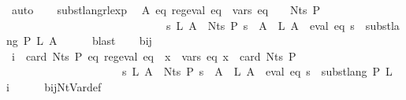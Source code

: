 \begin{isabellebody}
\ auto\isanewline
\ \ \isamarkupfalse%
\ subst{\isacharunderscore}{\kern0pt}lang{\isacharunderscore}{\kern0pt}rlexp\ \isamarkupfalse%
\ {\isachardoublequoteopen}{\isasymforall}A{\isachardot}{\kern0pt}\ {\isasymexists}eq{\isachardot}{\kern0pt}\ reg{\isacharunderscore}{\kern0pt}eval\ eq\ {\isasymand}\ vars\ eq\ {\isasymsubseteq}\ {\isasymgamma}{\isacharprime}{\kern0pt}\ {\isacharbackquote}{\kern0pt}\ Nts\ P\ {\isasymand}\isanewline
\ \ \ \ \ \ \ \ \ \ \ \ \ \ \ \ \ \ \ \ \ \ \ \ \ \ \ \ \ {\isacharparenleft}{\kern0pt}{\isasymforall}s\ L{\isachardot}{\kern0pt}\ {\isacharparenleft}{\kern0pt}{\isasymforall}A\ {\isasymin}\ Nts\ P{\isachardot}{\kern0pt}\ s\ {\isacharparenleft}{\kern0pt}{\isasymgamma}{\isacharprime}{\kern0pt}\ A{\isacharparenright}{\kern0pt}\ {\isacharequal}{\kern0pt}\ L\ A{\isacharparenright}{\kern0pt}\ {\isasymlongrightarrow}\ eval\ eq\ s\ {\isacharequal}{\kern0pt}\ subst{\isacharunderscore}{\kern0pt}lang\ P\ L\ A{\isacharparenright}{\kern0pt}{\isachardoublequoteclose}\isanewline
\ \ \ \ \isamarkupfalse%
\ blast\isanewline
\ \ \isamarkupfalse%
\ bij{\isacharunderscore}{\kern0pt}{\isasymgamma}{\isacharunderscore}{\kern0pt}{\isasymgamma}{\isacharprime}{\kern0pt}\ {\isacharasterisk}{\kern0pt}\ \isamarkupfalse%
\ {\isachardoublequoteopen}{\isasymforall}i\ {\isacharless}{\kern0pt}\ card\ {\isacharparenleft}{\kern0pt}Nts\ P{\isacharparenright}{\kern0pt}{\isachardot}{\kern0pt}\ {\isasymexists}eq{\isachardot}{\kern0pt}\ reg{\isacharunderscore}{\kern0pt}eval\ eq\ {\isasymand}\ {\isacharparenleft}{\kern0pt}{\isasymforall}x\ {\isasymin}\ vars\ eq{\isachardot}{\kern0pt}\ x\ {\isacharless}{\kern0pt}\ card\ {\isacharparenleft}{\kern0pt}Nts\ P{\isacharparenright}{\kern0pt}{\isacharparenright}{\kern0pt}\isanewline
\ \ \ \ \ \ \ \ \ \ \ \ \ \ \ \ \ \ \ \ {\isasymand}\ {\isacharparenleft}{\kern0pt}{\isasymforall}s\ L{\isachardot}{\kern0pt}\ {\isacharparenleft}{\kern0pt}{\isasymforall}A\ {\isasymin}\ Nts\ P{\isachardot}{\kern0pt}\ s\ {\isacharparenleft}{\kern0pt}{\isasymgamma}{\isacharprime}{\kern0pt}\ A{\isacharparenright}{\kern0pt}\ {\isacharequal}{\kern0pt}\ L\ A{\isacharparenright}{\kern0pt}\ {\isasymlongrightarrow}\ eval\ eq\ s\ {\isacharequal}{\kern0pt}\ subst{\isacharunderscore}{\kern0pt}lang\ P\ L\ {\isacharparenleft}{\kern0pt}{\isasymgamma}\ i{\isacharparenright}{\kern0pt}{\isacharparenright}{\kern0pt}{\isachardoublequoteclose}\isanewline
\ \ \ \ \isamarkupfalse%
\ bij{\isacharunderscore}{\kern0pt}Nt{\isacharunderscore}{\kern0pt}Var{\isacharunderscore}{\kern0pt}def\ \isamarkupfalse%

\end{isabellebody}
